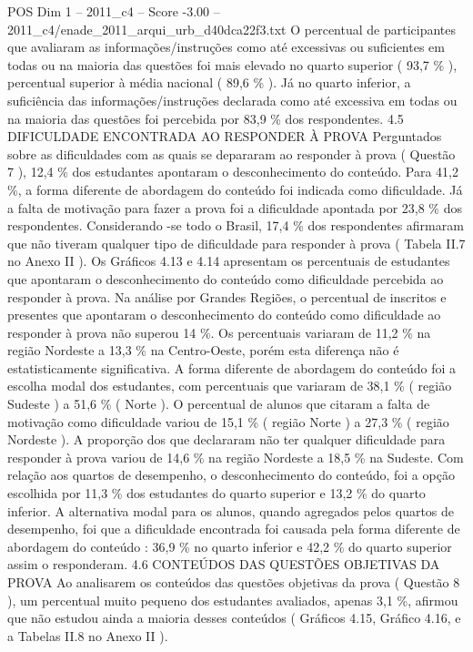 \begin{textsample}{POS Dim 1 – 2011\_c4 – Score -3.00 – 2011\_c4/enade\_2011\_arqui\_urb\_d40dca22f3.txt}
O percentual de participantes que avaliaram as informações/instruções como até excessivas ou suficientes em todas ou na maioria das questões foi mais elevado no quarto superior ( 93,7 \% ), percentual superior à média nacional ( 89,6 \% ).
Já no quarto inferior, a suficiência das informações/instruções declarada como até excessiva em todas ou na maioria das questões foi percebida por 83,9 \% dos respondentes. 4.5 DIFICULDADE ENCONTRADA AO RESPONDER À PROVA Perguntados sobre as dificuldades com as quais se depararam ao responder à prova ( Questão 7 ), 12,4 \% dos estudantes apontaram o desconhecimento do conteúdo.
Para 41,2 \%, a forma diferente de abordagem do conteúdo foi indicada como dificuldade.
Já a falta de motivação para fazer a prova foi a dificuldade apontada por 23,8 \% dos respondentes.
Considerando -se todo o Brasil, 17,4 \% dos respondentes afirmaram que não tiveram qualquer tipo de dificuldade para responder à prova ( Tabela II.7 no Anexo II ).
Os Gráficos 4.13 e 4.14 apresentam os percentuais de estudantes que apontaram o desconhecimento do conteúdo como dificuldade percebida ao responder à prova.
Na análise por Grandes Regiões, o percentual de inscritos e presentes que apontaram o desconhecimento do conteúdo como dificuldade ao responder à prova não superou 14 \%.
Os percentuais variaram de 11,2 \% na região Nordeste a 13,3 \% na Centro-Oeste, porém esta diferença não é estatisticamente significativa.
A forma diferente de abordagem do conteúdo foi a escolha modal dos estudantes, com percentuais que variaram de 38,1 \% ( região Sudeste ) a 51,6 \% ( Norte ).
O percentual de alunos que citaram a falta de motivação como dificuldade variou de 15,1 \% ( região Norte ) a 27,3 \% ( região Nordeste ).
A proporção dos que declararam não ter qualquer dificuldade para responder à prova variou de 14,6 \% na região Nordeste a 18,5 \% na Sudeste.
Com relação aos quartos de desempenho, o desconhecimento do conteúdo, foi a opção escolhida por 11,3 \% dos estudantes do quarto superior e 13,2 \% do quarto inferior.
A alternativa modal para os alunos, quando agregados pelos quartos de desempenho, foi que a dificuldade encontrada foi causada pela forma diferente de abordagem do conteúdo : 36,9 \% no quarto inferior e 42,2 \% do quarto superior assim o responderam. 4.6 CONTEÚDOS DAS QUESTÕES OBJETIVAS DA PROVA Ao analisarem os conteúdos das questões objetivas da prova ( Questão 8 ), um percentual muito pequeno dos estudantes avaliados, apenas 3,1 \%, afirmou que não estudou ainda a maioria desses conteúdos ( Gráficos 4.15, Gráfico 4.16, e a Tabelas II.8 no Anexo II ).

\end{textsample}
